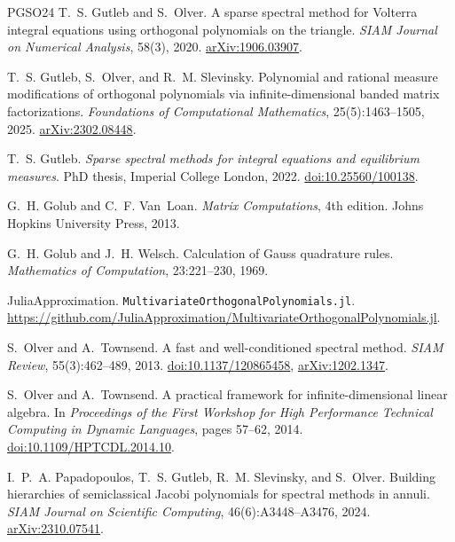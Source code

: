 \begin{thebibliography}{PGSO24}
T.~S. Gutleb and S.~Olver.
\newblock A sparse spectral method for {V}olterra integral equations using
  orthogonal polynomials on the triangle.
\newblock \emph{SIAM Journal on Numerical Analysis}, 58(3), 2020.
\newblock \href{https://arxiv.org/abs/1906.03907}{arXiv:1906.03907}.

T.~S. Gutleb, S.~Olver, and R.~M. Slevinsky.
\newblock Polynomial and rational measure modifications of orthogonal
  polynomials via infinite-dimensional banded matrix factorizations.
\newblock \emph{Foundations of Computational Mathematics}, 25(5):1463--1505,
  2025.
\newblock \href{https://arxiv.org/abs/2302.08448}{arXiv:2302.08448}.

T.~S. Gutleb.
\newblock \emph{Sparse spectral methods for integral equations and equilibrium
  measures}.
\newblock PhD thesis, Imperial College London, 2022.
\newblock \href{https://doi.org/10.25560/100138}{doi:10.25560/100138}.

G.~H. Golub and C.~F. Van~Loan.
\newblock \emph{Matrix Computations}, 4th edition.
\newblock Johns Hopkins University Press, 2013.

G.~H. Golub and J.~H. Welsch.
\newblock Calculation of {G}auss quadrature rules.
\newblock \emph{Mathematics of Computation}, 23:221--230, 1969.

JuliaApproximation.
\newblock \texttt{MultivariateOrthogonalPolynomials.jl}.
\newblock
  \url{https://github.com/JuliaApproximation/MultivariateOrthogonalPolynomials.jl}.

S.~Olver and A.~Townsend.
\newblock A fast and well-conditioned spectral method.
\newblock \emph{SIAM Review}, 55(3):462--489, 2013.
\newblock \href{https://doi.org/10.1137/120865458}{doi:10.1137/120865458},
  \href{https://arxiv.org/abs/1202.1347}{arXiv:1202.1347}.

S.~Olver and A.~Townsend.
\newblock A practical framework for infinite-dimensional linear algebra.
\newblock In \emph{Proceedings of the First Workshop for High Performance
  Technical Computing in Dynamic Languages}, pages 57--62, 2014.
\newblock \href{https://doi.org/10.1109/HPTCDL.2014.10}{doi:10.1109/HPTCDL.2014.10}.

I.~P.~A. Papadopoulos, T.~S. Gutleb, R.~M. Slevinsky, and S.~Olver.
\newblock Building hierarchies of semiclassical {J}acobi polynomials for
  spectral methods in annuli.
\newblock \emph{SIAM Journal on Scientific Computing}, 46(6):A3448--A3476,
  2024.
\newblock \href{https://arxiv.org/abs/2310.07541}{arXiv:2310.07541}.


\end{thebibliography}
